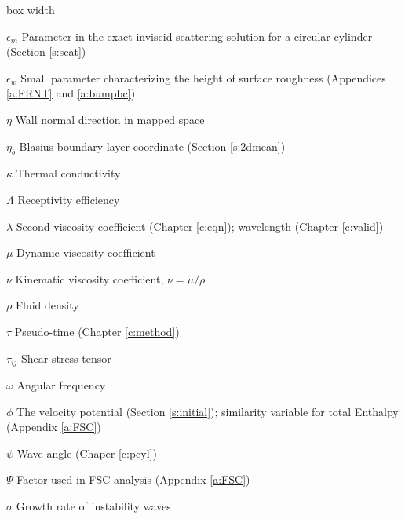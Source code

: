 \begin{descriptionlist}{box width}
\item[$\epsilon_m$]	Parameter in the exact inviscid scattering solution 
                        for a circular cylinder (Section \ref{s:scat})

\item[$\epsilon_w$]	Small parameter characterizing the 
                        height of surface roughness 
			(Appendices \ref{a:FRNT} and \ref{a:bumpbc})

\item[$\eta$]           Wall normal direction in mapped space

\item[$\eta_b$]         Blasius boundary layer coordinate
			(Section \ref{s:2dmean})

\item[$\kappa$]         Thermal conductivity

\item[$\Lambda$]	Receptivity efficiency

\item[$\lambda$]	Second viscosity coefficient (Chapter \ref{c:eqn}); 
                        wavelength (Chapter \ref{c:valid})

\item[$\mu$]            Dynamic viscosity coefficient

\item[$\nu$]            Kinematic viscosity coefficient, $\nu = \mu / \rho$

\item[$\rho$]           Fluid density

\item[$\tau$]		Pseudo-time (Chapter \ref{c:method})

\item[$\tau_{ij}$]      Shear stress tensor

\item[$\omega$]         Angular frequency

\item[$\phi$]		The velocity potential (Section \ref{s:initial});
                        similarity variable for total Enthalpy 
                        (Appendix \ref{a:FSC})

\item[$\psi$]		Wave angle (Chaper \ref{c:pcyl})

\item[$\Psi$]		Factor used in FSC analysis (Appendix \ref{a:FSC})

\item[$\sigma$]		Growth rate of instability waves


\end{descriptionlist}

